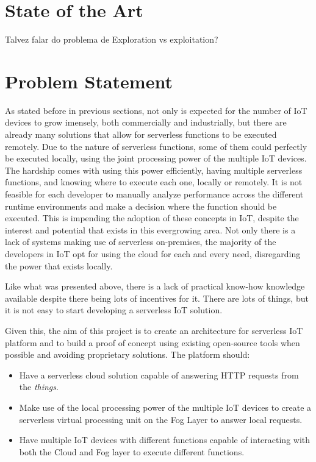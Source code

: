 \documentclass[conference]{IEEEtran}
\begin{document}
\section{State of the Art}

Talvez falar do problema de Exploration vs exploitation?

\section{Problem Statement}

As stated before in previous sections, not only is expected for the number of IoT
devices to grow imensely, both commercially and industrially, but there are
already many solutions that allow for serverless functions to be executed
remotely. Due to the nature of serverless functions, some of them could perfectly
be executed locally, using the joint processing power of the multiple IoT devices.
The hardship comes with using this power efficiently, having multiple serverless
functions, and knowing where to execute each one, locally or remotely. It is not
feasible for each developer to manually analyze performance across the different
runtime environments and make a decision where the function should be executed.
This is impending the adoption of these concepts in IoT, despite the interest and
potential that exists in this evergrowing area. Not only there is a lack of
systems making use of serverless on-premises, the majority of the developers in
IoT opt for using the cloud for each and every need, disregarding the power that
exists locally.

Like what was presented above, there is a lack of practical know-how knowledge
available despite there being lots of incentives for it. There are lots of things,
but it is not easy to start developing a serverless IoT solution.

Given this, the aim of this project is to create an architecture for serverless IoT
platform and to build a proof of concept using existing open-source tools when
possible and avoiding proprietary solutions. The platform should:
\begin{itemize}
    \item Have a serverless cloud solution capable of answering HTTP requests from
        the \textit{things}.
    \item Make use of the local processing power of the multiple IoT devices to
        create a serverless virtual processing unit on the Fog Layer to answer
        local requests.
    \item Have multiple IoT devices with different functions capable of
        interacting with both the Cloud and Fog layer to execute different
        functions. 
\end{itemize}
\end{document}
